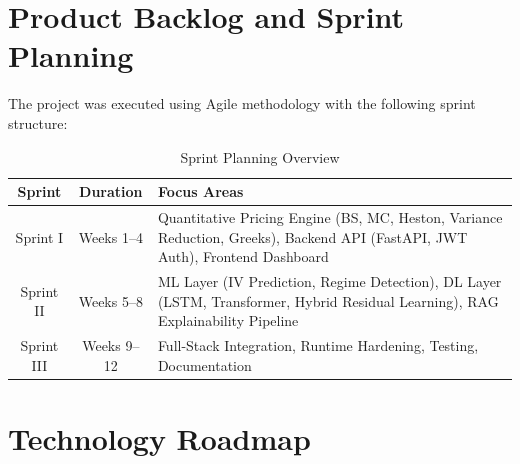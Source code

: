 \documentclass[12pt,a4paper]{report}
\begin{document}
\section{Product Backlog and Sprint Planning}

The project was executed using Agile methodology with the following sprint structure:

\begin{table}[H]
\centering
\caption{Sprint Planning Overview}
\label{tab:sprint-plan}
\begin{tabularx}{\textwidth}{|c|c|X|}
\hline
\textbf{Sprint} & \textbf{Duration} & \textbf{Focus Areas} \\
\hline
Sprint I & Weeks 1--4 & Quantitative Pricing Engine (BS, MC, Heston, Variance Reduction, Greeks), Backend API (FastAPI, JWT Auth), Frontend Dashboard \\
\hline
Sprint II & Weeks 5--8 & ML Layer (IV Prediction, Regime Detection), DL Layer (LSTM, Transformer, Hybrid Residual Learning), RAG Explainability Pipeline \\
\hline
Sprint III & Weeks 9--12 & Full-Stack Integration, Runtime Hardening, Testing, Documentation \\
\hline
\end{tabularx}
\end{table}

\section{Technology Roadmap}
\end{document}
